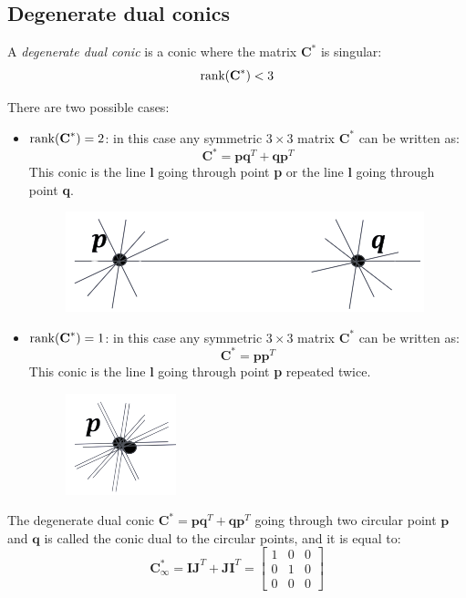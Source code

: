 \documentclass[12pt, a4paper]{report}
\newtheorem[style=M,bodystyle=\normalfont]{theorem}{Theorem}
\newtheorem[style=M,bodystyle=\normalfont]{corollary}{Corollary}
\newtheorem[style=M,bodystyle=\normalfont]{lemma}{Lemma}
\newtheorem[style=M,bodystyle=\normalfont]{definition}{Definition}
\begin{document}
    \subsection{Degenerate dual conics}
    \begin{definition}
        A \emph{degenerate dual conic} is a conic where the matrix $\textbf{C}^{*}$ is singular: \[\textnormal{rank}(\textbf{C}^{*}) < 3\]
    \end{definition}
    There are two possible cases: 
    \begin{itemize}
        \item $\textnormal{rank}(\textbf{C}^{*}) = 2$: in this case any symmetric $3 \times 3$ matrix $\textbf{C}^{*}$ can be written as:
            \[\textbf{C}^{*}=\textbf{pq}^T+\textbf{qp}^T\]
            This conic is the line $\textbf{l}$ going through point \textbf{p} or the line $\textbf{l}$ going through point \textbf{q}. 
            \begin{figure}[H]
                \centering
                \includegraphics[width=0.5\linewidth]{images/deg2.png}
            \end{figure}
        \item $\textnormal{rank}(\textbf{C}^{*}) = 1$: in this case any symmetric $3 \times 3$ matrix $\textbf{C}^{*}$ can be written as:
            \[\textbf{C}^{*}=\textbf{pp}^T\]
            This conic is the line $\textbf{l}$ going through point \textbf{p} repeated twice. 
            \begin{figure}[H]
                \centering
                \includegraphics[width=0.2\linewidth]{images/deg1.png}
            \end{figure}
    \end{itemize}

    \begin{definition}
        The degenerate dual conic $\textbf{C}^{*}=\textbf{pq}^T+\textbf{qp}^T$ going through two circular point $\textbf{p}$ and $\textbf{q}$ is called the conic dual to the 
        circular points, and it is equal to: 
        \[\textbf{C}^{*}_{\infty}=\textbf{IJ}^{T}+\textbf{JI}^{T}=
        \begin{bmatrix}
            1 & 0 & 0 \\
            0 & 1 & 0 \\
            0 & 0 & 0 
        \end{bmatrix}\]
    \end{definition}
\end{document}
